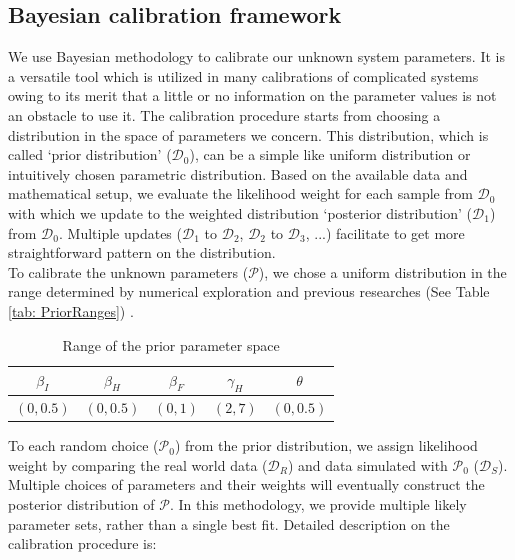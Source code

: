 \subsection{Bayesian calibration framework}

We use Bayesian methodology to calibrate our unknown system parameters. It is a versatile tool which is utilized in many calibrations of complicated systems owing to its merit that a little or no information on the parameter values is not an obstacle to use it. The calibration procedure starts from choosing a distribution in the space of parameters we concern. This distribution, which is called `prior distribution' ($\mathcal{D}_0$), can be a simple like uniform distribution or intuitively chosen parametric distribution. Based on the available data and mathematical setup, we evaluate the likelihood weight for each sample from $\mathcal{D}_0$ with which we update to the weighted distribution `posterior distribution' ($\mathcal{D}_1$) from $\mathcal{D}_0$. Multiple updates ($\mathcal{D}_1$ to $\mathcal{D}_2$, $\mathcal{D}_2$ to $\mathcal{D}_3$, ...) facilitate to get more straightforward pattern on the distribution.\\
To calibrate the unknown parameters ($\mathcal{P}$), we chose a uniform distribution in the range determined by numerical exploration and previous researches (See Table \ref{tab: PriorRanges}) \cite{Rivers2014}. \\

\begin{table}[ht]
\caption{Range of the prior parameter space} %
\centering %
\begin{tabular}{c c c c c}
\hline\hline %
$\beta_{I}$ & $\beta_{H}$ & $\beta_{F}$ & $\gamma_{H}$ & $\theta$ \\ [0.5ex]
\hline %
$(0,0.5)$ & $(0,0.5)$ & $(0,1)$ & $(2,7)$ & $(0,0.5)$ \\ [0.5ex]
\hline
\end{tabular}
\label{tab:PriorRanges}
\end{table}


To each random choice ($\mathcal{P}_0$) from the prior distribution, we assign likelihood weight by comparing the real world data ($\mathcal{D}_R$) and data simulated with $\mathcal{P}_0$ ($\mathcal{D}_S$). Multiple choices of parameters and their weights will eventually construct the posterior distribution of $\mathcal{P}$. In this methodology, we provide multiple likely parameter sets, rather than a single best fit. Detailed description on the calibration procedure is:\\

